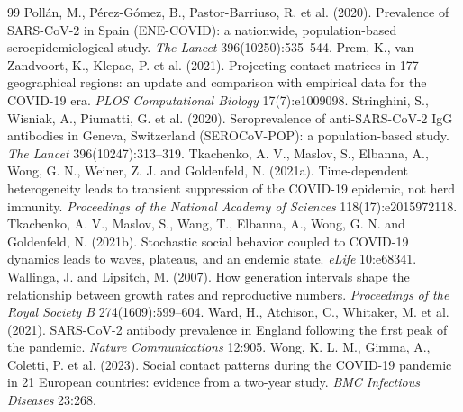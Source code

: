 \documentclass[11pt]{article}
\theoremstyle{remark}
\begin{document}
\begin{thebibliography}{99}
 Poll\'an, M., P\'erez-G\'omez, B., Pastor-Barriuso, R. et al. (2020). Prevalence of SARS-CoV-2 in Spain (ENE-COVID): a nationwide, population-based seroepidemiological study. \emph{The Lancet} 396(10250):535--544.
 Prem, K., van Zandvoort, K., Klepac, P. et al. (2021). Projecting contact matrices in 177 geographical regions: an update and comparison with empirical data for the COVID-19 era. \emph{PLOS Computational Biology} 17(7):e1009098.
 Stringhini, S., Wisniak, A., Piumatti, G. et al. (2020). Seroprevalence of anti-SARS-CoV-2 IgG antibodies in Geneva, Switzerland (SEROCoV-POP): a population-based study. \emph{The Lancet} 396(10247):313--319.
 Tkachenko, A. V., Maslov, S., Elbanna, A., Wong, G. N., Weiner, Z. J. and Goldenfeld, N. (2021a). Time-dependent heterogeneity leads to transient suppression of the COVID-19 epidemic, not herd immunity. \emph{Proceedings of the National Academy of Sciences} 118(17):e2015972118.
 Tkachenko, A. V., Maslov, S., Wang, T., Elbanna, A., Wong, G. N. and Goldenfeld, N. (2021b). Stochastic social behavior coupled to COVID-19 dynamics leads to waves, plateaus, and an endemic state. \emph{eLife} 10:e68341.
 Wallinga, J. and Lipsitch, M. (2007). How generation intervals shape the relationship between growth rates and reproductive numbers. \emph{Proceedings of the Royal Society B} 274(1609):599--604.
 Ward, H., Atchison, C., Whitaker, M. et al. (2021). SARS-CoV-2 antibody prevalence in England following the first peak of the pandemic. \emph{Nature Communications} 12:905.
 Wong, K. L. M., Gimma, A., Coletti, P. et al. (2023). Social contact patterns during the COVID-19 pandemic in 21 European countries: evidence from a two-year study. \emph{BMC Infectious Diseases} 23:268.
\end{thebibliography}
\end{document}
